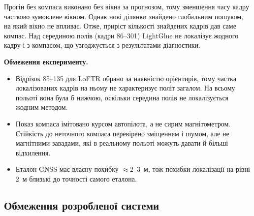 \documentclass[a4paper, 12pt, titlepage]{article}
\begin{document}
Прогін без компаса виконано без вікна за прогнозом, тому зменшення часу кадру частково зумовлене вікном. Однак нові ділянки знайдено глобальним пошуком, на який вікно не впливає. Отже, приріст кількості знайдених кадрів дав саме компас. Над серединою полів (кадри 86--301) LightGlue не локалізує жодного кадру і з компасом, що узгоджується з результатами діагностики.

\textbf{Обмеження експерименту.}
\begin{itemize}
    \item Відрізок 85--135 для LoFTR обрано за наявністю орієнтирів, тому частка локалізованих кадрів на ньому не характеризує політ загалом. На всьому польоті вона була б нижчою, оскільки середина полів не локалізується жодним методом.
    \item Показ компаса імітовано курсом автопілота, а не сирим магнітометром. Стійкість до неточного компаса перевірено зміщенням і шумом, але не магнітними завадами, які в реальному польоті можуть давати й більші відхилення.
    \item Еталон GNSS має власну похибку $\approx 2$--$3$~м, тож похибки локалізації на рівні 2~м близькі до точності самого еталона.
\end{itemize}


\subsection{Обмеження розробленої системи}
\end{document}
